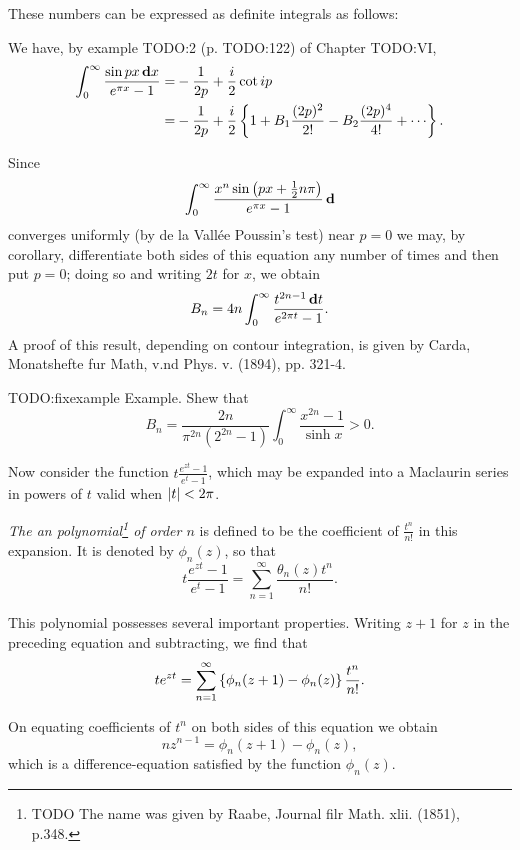 %
%
These numbers can be expressed as definite integrals as follows:

We have, by example TODO:2 (p. TODO:122) of Chapter TODO:VI,
\begin{align*}
  \int_{0}^{\infty}
  \frac{\sin px \dmeasure x}{e^{\pi x} - 1}
  =&
  -\frac{1}{2p} + \frac{i}{2} \cot ip
  \\
  =&
  -\frac{1}{2p}
  +
  \frac{i}{2} \thebrace{
    1
    + B_{1} \frac{(2p)^{2}}{2!}
    - B_{2} \frac{(2p)^{4}}{4!}
    + \cdots
    }.
\end{align*}

Since
$$
\int_{0}^{\infty}
\frac{x^{n} \sin \left( px + \frac{1}{2} n \pi \right)}{e^{\pi x} - 1}
\, \mathbf{d} 
$$
converges uniformly (by de la Vall\'ee Poussin's test) near
$p=0$ we
may, by  corollary, differentiate both
sides of this equation any number of times and then put $p = 0$; doing
so and writing $2t$ for $x$, we obtain
$$
B_{n}
=
4n
\int_{0}^{\infty}
\frac{t^{2n-1} \, \mathbf{d} t}{e^{2\pi t} - 1}.
$$
A proof of this result, depending on contour integration, is given by
Carda, Monatshefte fur Math, v.nd Phys. v. (1894), pp. 321-4.

TODO:fixexample
Example. Shew that
$$
B_{n}
=
\frac{2n}{\pi^{2n} (2^{2n}-1)}
\int_{0}^{\infty}
\frac{x^{2n}-1}{\sinh x}
> 0.
$$

Now consider the function $t \frac{e^{zt}-1}{e^{t}-1}$, which may be
expanded into a
Maclaurin series in powers of $t$ valid when $\left| t \right| < 2\pi$.

\emph{The \Bernoulli an polynomial\footnote{TODO The name was given by
    Raabe, Journal filr Math. xlii. (1851), p.348.} of order $n$} is
defined to be the coefficient of $\frac{t^{n}}{n!}$
in this expansion. It is denoted by $\phi_{n}(z)$, so that
$$
t \frac{e^{zt}-1}{e^{t}-1}
=
\sum_{n=1}^{\infty}
\frac{\theta_{n}(z) t^{n}}{n!}.
$$

This polynomial possesses several important properties. Writing $z+1$
for $z$ in the preceding equation and subtracting, we find that
$$
t e^{zt}
=
\sum_{n=1}^{\infty}
\left\{ 
  \phi_{n}(z+1) - \phi_{n}(z)
 \right\}
\frac{t^{n}}{n!}.
$$

On equating coefficients of $t^{n}$ on both
sides of this equation we obtain
$$
n z^{n-1}
=
\phi_{n}(z+1) - \phi_{n}(z),
$$
which is a difference-equation satisfied by the function $\phi_{n}(z)$.

%
%


